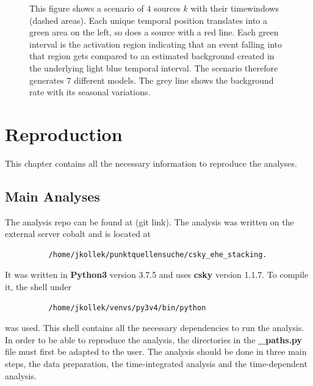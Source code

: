 \begin{figure}
{}
  \caption{This figure shows a scenario of $\num{4}$ sources $k$ with their timewindows (dashed areas). Each unique temporal position translates into a green area on the left, so does a source with a red line. Each green interval is the activation region indicating that an event falling into that region gets compared to an estimated background created in the underlying light blue temporal interval. The scenario therefore generates $\num{7}$ different models. The grey line shows the background rate with its seasonal variations.}
  \label{fig:activation}
\end{figure}

\chapter{Reproduction}

This chapter contains all the necessary information to reproduce the analyses.

\section{Main Analyses}

The analysis repo can be found at (git link).
The analysis was written on the external server cobalt and is located at
\begin{verbatim}
          /home/jkollek/punktquellensuche/csky_ehe_stacking.
\end{verbatim}
It was written in \textbf{Python3} version 3.7.5 and uses \textbf{csky} version 1.1.7.
To compile it, the shell under
\begin{verbatim}
          /home/jkollek/venvs/py3v4/bin/python
\end{verbatim}
was used.
This shell contains all the necessary dependencies to run the analysis.
In order to be able to reproduce the analysis, the directories in the \textbf{\_paths.py} file must first be adapted to the user.
The analysis should be done in three main steps, the data preparation, the time-integrated analysis and the time-dependent analysis.

